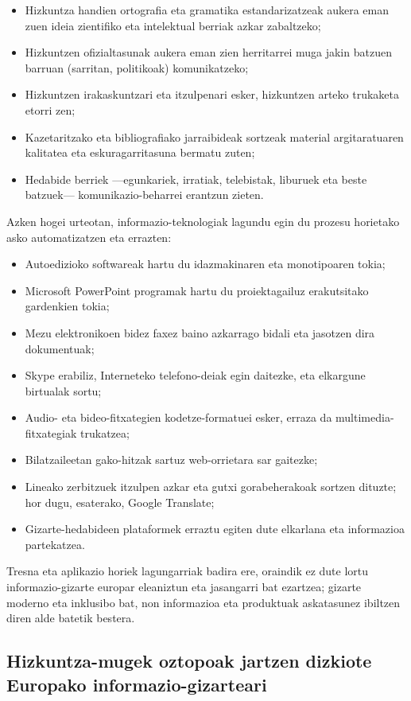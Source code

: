 \begin{multicols}{2}
\begin{itemize}
      \item Hizkuntza handien ortografia eta gramatika estandarizatzeak aukera eman zuen ideia zientifiko eta intelektual berriak azkar zabaltzeko;
      \item Hizkuntzen ofizialtasunak aukera eman zien herritarrei muga jakin batzuen barruan (sarritan, politikoak) komunikatzeko;
      \item Hizkuntzen irakaskuntzari eta itzulpenari esker, hizkuntzen arteko trukaketa etorri zen;
      \item Kazetaritzako eta bibliografiako jarraibideak sortzeak material argitaratuaren kalitatea eta eskuragarritasuna bermatu zuten;
      \item Hedabide berriek —egunkariek, irratiak, telebistak, liburuek eta beste batzuek— komunikazio-beharrei erantzun zieten.
\end{itemize}
Azken hogei urteotan, informazio-teknologiak lagundu egin du prozesu horietako asko automatizatzen eta errazten:
\begin{itemize}
      \item Autoedizioko softwareak hartu du idazmakinaren eta monotipoaren tokia;
      \item Microsoft PowerPoint programak hartu du proiektagailuz erakutsitako gardenkien tokia;
      \item Mezu elektronikoen bidez faxez baino azkarrago bidali eta jasotzen dira dokumentuak;
      \item Skype erabiliz, Interneteko telefono-deiak egin daitezke, eta elkargune birtualak sortu;
      \item Audio- eta bideo-fitxategien kodetze-formatuei esker, erraza da multimedia-fitxategiak trukatzea;
      \item Bilatzaileetan gako-hitzak sartuz web-orrietara sar gaitezke;
      \item Lineako zerbitzuek itzulpen azkar eta gutxi gorabeherakoak sortzen dituzte; hor dugu, esaterako, Google Translate;
      \item Gizarte-hedabideen plataformek erraztu egiten dute elkarlana eta informazioa partekatzea. 
\end{itemize}
   Tresna eta aplikazio horiek lagungarriak badira ere, oraindik ez dute lortu informazio-gizarte europar eleaniztun eta jasangarri bat ezartzea; gizarte moderno eta inklusibo bat, non informazioa eta produktuak askatasunez ibiltzen diren alde batetik bestera.

\subsection{Hizkuntza-mugek oztopoak jartzen dizkiote Europako informazio-gizarteari}
  

\end{multicols}
